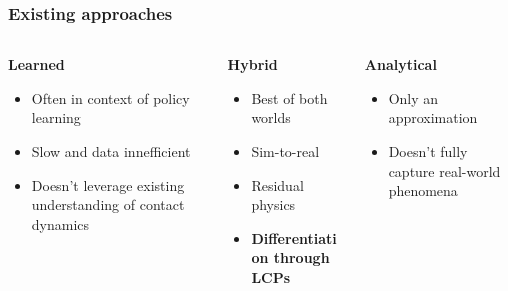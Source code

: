 \documentclass{beamer}
\begin{document}
\begin{frame}
    \frametitle{Existing approaches}
    \begin{columns}[t]
        \begin{column}{0.33\textwidth}
            \textbf{Learned}
            \begin{itemize}
                \item Often in context of policy learning
                \item Slow and data innefficient
                \item Doesn't leverage existing understanding of contact dynamics
            \end{itemize}
        \end{column}

        \begin{column}{0.33\textwidth}
            \textbf{Hybrid}
            \begin{itemize}
                \item Best of both worlds
                \item Sim-to-real
                \item Residual physics
                \item \textbf{Differentiation through LCPs}
            \end{itemize}
        \end{column}

        \begin{column}{0.33\textwidth}
            \textbf{Analytical}
            \begin{itemize}
                \item Only an approximation
                \item Doesn't fully capture real-world phenomena
            \end{itemize}
        \end{column}
    \end{columns}
\end{frame}
\end{document}
